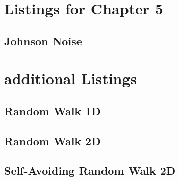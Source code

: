 \section{Listings for Chapter 5}

\subsection{Johnson Noise}

\section{additional Listings}



\subsection{Random Walk 1D}

\subsection{Random Walk 2D}

\subsection{Self-Avoiding Random Walk 2D}



%
%


